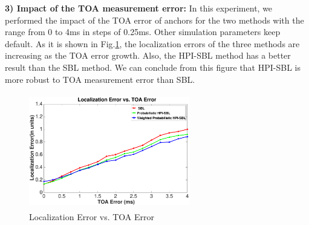 \textbf{3) Impact of the TOA measurement error:}
In this experiment, we performed the impact of the TOA error of anchors for the two methods with the range from 0 to 4ms in steps of 0.25ms. 
Other simulation parameters keep default. 
As it is shown in Fig.\ref{fig6}, the localization errors of the three methods are increasing as the TOA error growth. 
Also, the HPI-SBL method has a better result than the SBL method. We can conclude from this figure that HPI-SBL is more robust to TOA measurement error than SBL.

  \begin{figure}[htb]       
            \centering
			\vspace{-2mm}
            \includegraphics[height=5.0cm,width=7.0cm]{image/TOA.eps}
            \caption{Localization Error vs. TOA Error}
             \vspace{-5mm}
             \label{fig6}
        \end{figure}
		
	




